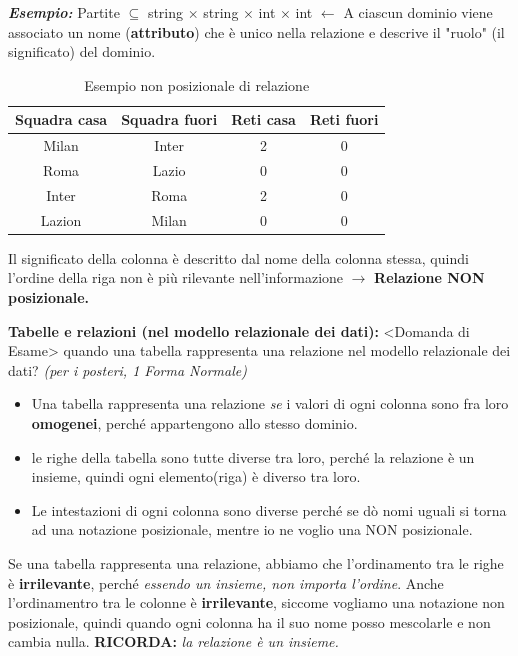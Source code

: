\documentclass{article}
\begin{document}
\textbf{\textit{Esempio: }} Partite $\subseteq$ string $\times$ string $\times$ int $\times$ int $\leftarrow$ A ciascun dominio viene associato un nome (\textbf{attributo}) che è unico nella relazione e descrive il "ruolo" (il significato) del dominio.

\begin{table}[h!]
    \centering
    \begin{tabular}{|c|c|c|c|}
    \hline
    \textbf{Squadra casa}     &  \textbf{Squadra fuori} & \textbf{Reti casa }&  \textbf{Reti fuori}\\
    \hline
    Milan & Inter & 2 & 0 \\
    \hline
    Roma & Lazio & 0 & 0 \\
    \hline
    Inter & Roma & 2 & 0 \\
    \hline
    Lazion & Milan & 0 & 0 \\
    \hline
    
    \end{tabular}
    \caption{Esempio non posizionale di relazione}
    \label{tab:esempiononrelaz}
\end{table}
Il significato della colonna è descritto dal nome della colonna stessa, quindi l'ordine della riga non è più rilevante nell'informazione $\to$ \textbf{Relazione NON posizionale.}

\textbf{Tabelle e relazioni (nel modello relazionale dei dati):}
<Domanda di Esame> quando una tabella rappresenta una relazione nel modello relazionale dei dati? \textit{(per i posteri, 1 Forma Normale)}
\begin{itemize}
    \item Una tabella rappresenta una relazione \textit{se} i valori di ogni colonna sono fra loro \textbf{omogenei}, perché appartengono allo stesso dominio.
    \item le righe della tabella sono tutte diverse tra loro, perché la relazione è un insieme, quindi ogni elemento(riga) è diverso tra loro.
    \item Le intestazioni di ogni colonna sono diverse perché se dò nomi uguali si torna ad una notazione posizionale, mentre io ne voglio una NON posizionale. 
\end{itemize}

Se una tabella rappresenta una relazione, abbiamo che l'ordinamento tra le righe è \textbf{irrilevante}, perché \textit{essendo un insieme, non importa l'ordine}. Anche l'ordinamentro tra le colonne è \textbf{irrilevante}, siccome vogliamo una notazione non posizionale, quindi quando ogni colonna ha il suo nome posso mescolarle e non cambia nulla.  \textbf{RICORDA: }\textit{la relazione è un insieme.}
\end{document}
